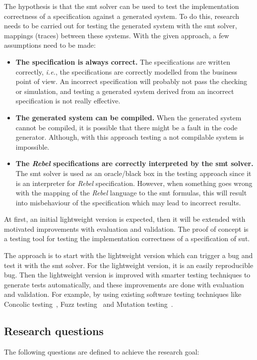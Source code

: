 The hypothesis is that the \gls{smt} solver can be used to test the implementation
correctness of a specification against a generated system. To do this,
research needs to be carried out for testing the generated system
with the \gls{smt} solver, mappings (traces) between these systems. With the given approach, a
few assumptions need to be made:

\begin{itemize}
\item \textbf{The specification is always correct.}
The specifications are written correctly, \textit{i.e.}, the specifications are
correctly modelled from the business point of view. An incorrect specification
will probably not pass the checking or simulation, and testing a generated
system derived from an incorrect specification is not really effective.
\item \textbf{The generated system can be compiled.} When the generated
system cannot be compiled, it is possible that there might be a fault in the
code generator. Although, with this approach testing a not compilable system is
impossible.
\item \textbf{The \textit{Rebel} specifications are correctly interpreted by the \gls{smt}
solver.} The \gls{smt} solver is used as an oracle/black box in the testing approach
since it is an interpreter for \textit{Rebel} specification. However, when
something goes wrong with the mapping of the \textit{Rebel} language to the \gls{smt}
formulas, this will result into misbehaviour of the specification which may lead
to incorrect results.
\end{itemize}

At first, an initial lightweight version is expected, then it will be extended with motivated
improvements with evaluation and validation. The proof of concept is a testing
tool for testing the implementation correctness of a specification of \gls{sut}.

The
approach is to start with the lightweight version which can trigger a bug and
test it with the \gls{smt} solver. For the lightweight version, it is an easily
reproducible bug. Then the lightweight version is improved with smarter
testing techniques to generate tests automatically, and these improvements are done
with evaluation and validation. For example, by using existing software testing
techniques like Concolic testing~\cite{sen2007concolic}, Fuzz testing~\cite{godefroid2008automated} and Mutation testing~\cite{jia2011analysis}.

\subsection{Research questions}\label{sec:research-questions}
The following questions are defined to achieve the research goal:

